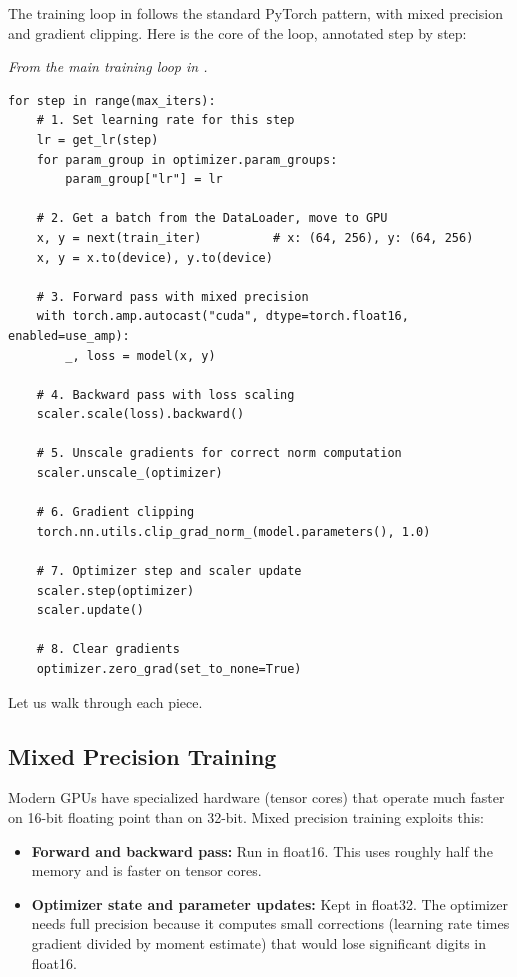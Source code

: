 The training loop in  follows the standard PyTorch pattern, with mixed precision and gradient clipping. Here is the core of the loop, annotated step by step:

\concepttag
{\small\itshape From the main training loop in .}
\begin{lstlisting}
for step in range(max_iters):
    # 1. Set learning rate for this step
    lr = get_lr(step)
    for param_group in optimizer.param_groups:
        param_group["lr"] = lr

    # 2. Get a batch from the DataLoader, move to GPU
    x, y = next(train_iter)          # x: (64, 256), y: (64, 256)
    x, y = x.to(device), y.to(device)

    # 3. Forward pass with mixed precision
    with torch.amp.autocast("cuda", dtype=torch.float16, enabled=use_amp):
        _, loss = model(x, y)

    # 4. Backward pass with loss scaling
    scaler.scale(loss).backward()

    # 5. Unscale gradients for correct norm computation
    scaler.unscale_(optimizer)

    # 6. Gradient clipping
    torch.nn.utils.clip_grad_norm_(model.parameters(), 1.0)

    # 7. Optimizer step and scaler update
    scaler.step(optimizer)
    scaler.update()

    # 8. Clear gradients
    optimizer.zero_grad(set_to_none=True)
\end{lstlisting}

Let us walk through each piece.

\subsection{Mixed Precision Training}

Modern GPUs have specialized hardware (tensor cores) that operate much faster on 16-bit floating point than on 32-bit. Mixed precision training exploits this:

\begin{itemize}
  \item \textbf{Forward and backward pass:} Run in float16. This uses roughly half the memory and is faster on tensor cores.
  \item \textbf{Optimizer state and parameter updates:} Kept in float32. The optimizer needs full precision because it computes small corrections (learning rate times gradient divided by moment estimate) that would lose significant digits in float16.
\end{itemize}

